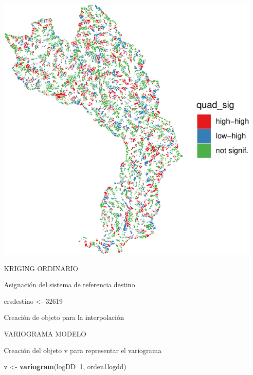 \documentclass[11pt,]{article}
\newenvironment{Shaded}{\begin{snugshade}}{\end{snugshade}}
\newcommand{\KeywordTok}[1]{\textcolor[rgb]{0.13,0.29,0.53}{\textbf{#1}}}
\newcommand{\DataTypeTok}[1]{\textcolor[rgb]{0.13,0.29,0.53}{#1}}
\newcommand{\DecValTok}[1]{\textcolor[rgb]{0.00,0.00,0.81}{#1}}
\newcommand{\StringTok}[1]{\textcolor[rgb]{0.31,0.60,0.02}{#1}}
\newcommand{\OperatorTok}[1]{\textcolor[rgb]{0.81,0.36,0.00}{\textbf{#1}}}
\newcommand{\NormalTok}[1]{#1}
\begin{document}
\includegraphics{proyecto_f_files/figure-latex/unnamed-chunk-89-1.pdf}

KRIGING ORDINARIO

Asignación del sistema de referencia destino

\begin{Shaded}
\begin{Highlighting}[]
\NormalTok{crsdestino <-}\StringTok{ }\DecValTok{32619}
\end{Highlighting}
\end{Shaded}

Creación de objeto para la interpolación

\begin{Shaded}
\end{Shaded}

VARIOGRAMA MODELO

Creación del objeto v para representar el variograma

\begin{Shaded}
\begin{Highlighting}[]
\NormalTok{v <-}\StringTok{ }\KeywordTok{variogram}\NormalTok{(logDD}\OperatorTok{~}\DecValTok{1}\NormalTok{, orden1logdd)}
\end{Highlighting}
\end{Shaded}
\end{document}
